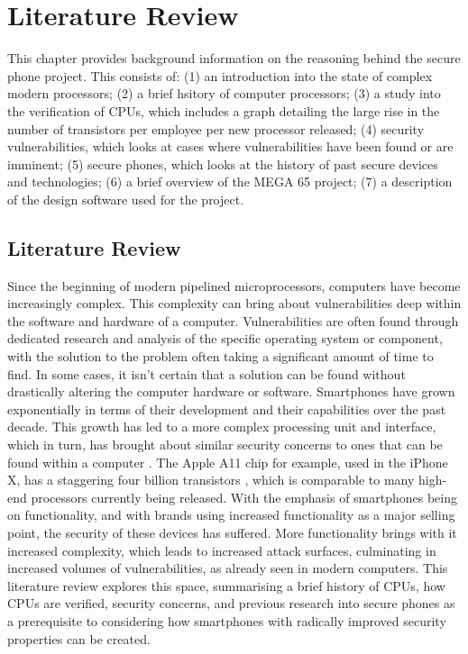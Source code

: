 
\chapter{Literature Review} %

\label{Chapter2} %

This chapter provides background information on the reasoning behind the secure phone project. This consists of: (1) an introduction into the state of complex modern processors; (2) a brief hsitory of computer processors; (3) a study into the verification of CPUs, which includes a graph detailing the large rise in the number of transistors per employee per new processor released; (4) security vulnerabilities, which looks at cases where vulnerabilities have been found or are imminent; (5) secure phones, which looks at the history of past secure devices and technologies; (6) a brief overview of the MEGA 65 project; (7) a description of the design software used for the project.\\


\section{Literature Review}

Since the beginning of modern pipelined microprocessors, computers have become increasingly complex. This complexity can bring about vulnerabilities deep within the software and hardware of a computer. Vulnerabilities are often found through dedicated research and analysis of the specific operating system or component, with the solution to the problem often taking a significant amount of time to find. In some cases, it isn’t certain that a solution can be found without drastically altering the computer hardware or software. 
Smartphones have grown exponentially in terms of their development and their capabilities over the past decade. This growth has led to a more complex processing unit and interface, which in turn, has brought about similar security concerns to ones that can be found within a computer \cite{RN27}. The Apple A11 chip for example, used in the iPhone X, has a staggering four billion transistors \cite{RN28}, which is comparable to many high-end processors currently being released. With the emphasis of smartphones being on functionality, and with brands using increased functionality as a major selling point, the security of these devices has suffered. More functionality brings with it increased complexity, which leads to increased attack surfaces, culminating in increased volumes of vulnerabilities, as already seen in modern computers.
This literature review explores this space, summarising a brief history of CPUs, how CPUs are verified, security concerns, and previous research into secure phones as a prerequisite to considering how smartphones with radically improved security properties can be created.

